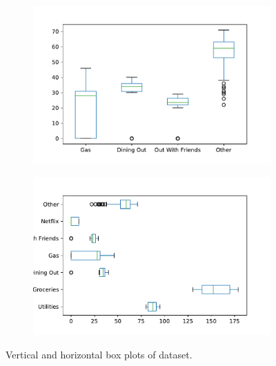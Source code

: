 \begin{figure}[H] %
\captionsetup[subfigure]{justification=centering}
\centering
\begin{subfigure}{.49\textwidth}
    \includegraphics[width=\textwidth]{figures/box1.pdf}
\end{subfigure}
%
\begin{subfigure}{.49\textwidth}
    \includegraphics[width=\textwidth]{figures/box2.pdf}
\end{subfigure}
\caption{Vertical and horizontal box plots of  dataset.}
\end{figure}




